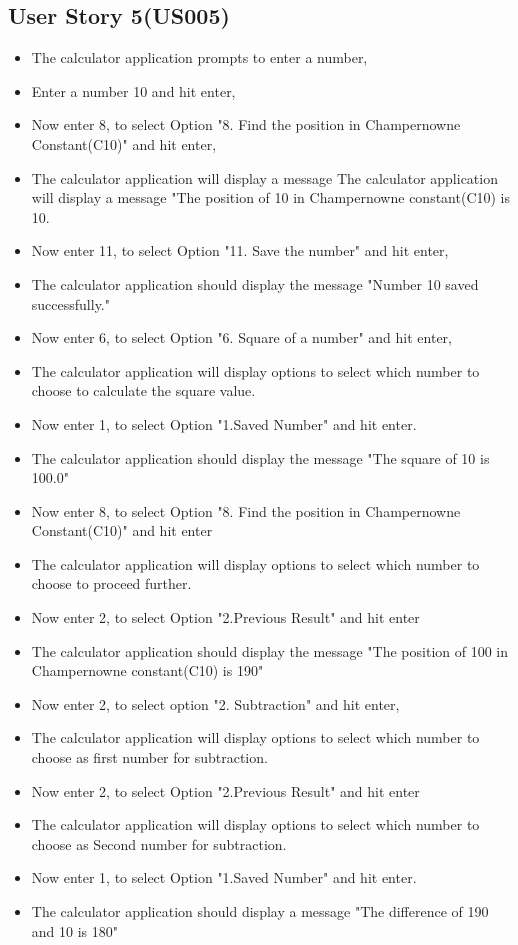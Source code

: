 \documentclass[12pt, a4paper]{report}
\begin{document}
\subsection{User Story 5(US005)}
\begin{itemize}
    \item The calculator application prompts to enter a number,
    \item Enter a number 10 and hit enter,
    \item Now enter 8, to select Option "8. Find the position in Champernowne Constant(C10)" and hit enter,
    \item The calculator application will display a message The calculator application will display a message "The position of 10 in Champernowne constant(C10) is 10.
    \item Now enter 11, to select Option "11. Save the number" and hit enter,
    \item The calculator application should display the message "Number 10 saved successfully."
    \item Now enter 6, to select Option "6. Square of a number" and hit enter,
    \item The calculator application will display options to select which number to choose to calculate the square value.
    \item Now enter 1, to select Option "1.Saved Number" and hit enter.
    \item The calculator application should display the message "The square of 10 is 100.0"
    \item Now enter 8, to select Option "8. Find the position in Champernowne Constant(C10)" and hit enter
    \item The calculator application will display options to select which number to choose to proceed further.
    \item Now enter 2, to select Option "2.Previous Result" and hit enter
   \item The calculator application should display the message "The position of 100 in Champernowne constant(C10) is 190"
   \item Now enter 2, to select option "2. Subtraction" and hit enter,
   \item The calculator application will display options to select which number to choose as first number for subtraction.
   \item Now enter 2, to select Option "2.Previous Result" and hit enter
    \item The calculator application will display options to select which number to choose as Second number for subtraction.
    \item Now enter 1, to select Option "1.Saved Number" and hit enter.
    \item The calculator application should display a message "The difference of 190 and 10 is 180"
    
\end{itemize}
\end{document}
